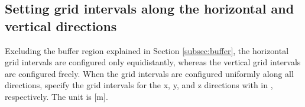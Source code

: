 \subsection{Setting grid intervals along the horizontal and vertical directions} \label{subsec:gridinterv}

Excluding the buffer region explained in Section \ref{subsec:buffer}, the horizontal grid intervals are configured only equidistantly, whereas the vertical grid intervals are configured freely.
When the grid intervals are configured uniformly along all directions, specify the grid intervals for the x, y, and z directions with  in , respectively.
The unit is [m].

